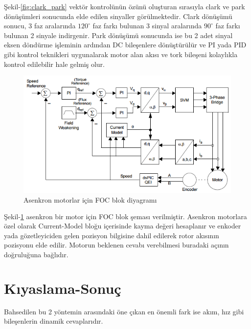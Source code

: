\documentclass[10pt,a4paper]{article}
\begin{document}
	Şekil-\ref{fig:clark_park}  vektör kontrolünün özünü oluşturan sırasıyla clark ve park dönüşümleri sonucunda elde edilen sinyaller görülmektedir. Clark dönüşümü sonucu, 3 faz aralarında  $120^\circ$ faz farkı bulunan 3 sinyal aralarında $90^\circ$ faz farkı bulunan 2 sinyale indirgenir.\newline
	Park dönüşümü sonucunda ise bu 2 adet sinyal eksen döndürme işleminin ardından DC bileşenlere dönüştürülür ve PI yada PID gibi kontrol teknikleri uygunalarak motor alan akısı ve tork bileşeni kolaylıkla kontrol edilebilir hale gelmiş olur.
	
	\begin{figure}[hp]
		\centering	
		\shorthandoff{=}
		\includegraphics[width=0.7\linewidth]{foc_acim.png}
		\shorthandon{=}	
		\caption{Asenkron motorlar için FOC blok diyagramı}
		\label{fig:foc_acim}
	\end{figure}
	
	Şekil-\ref{fig:foc_acim} asenkron bir motor için FOC blok şeması verilmiştir. Asenkron motorlara özel olarak Current-Model bloğu içerisinde kayma değeri hesaplanır ve enkoder yada gözetleyiciden gelen pozisyon bilgisine dahil edilerek rotor akısının pozisyonu elde edilir. Motorun beklenen cevabı verebilmesi buradaki açının doğruluğuna bağlıdır.
	
	\section{Kıyaslama-Sonuç}
	Bahsedilen bu 2 yöntemin arasındaki öne çıkan en önemli fark ise akım, hız gibi bileşenlerin dinamik cevaplarıdır.
	
\end{document}
